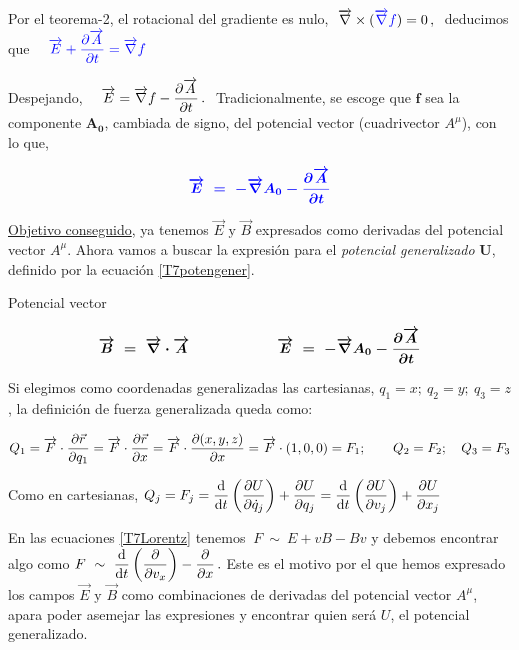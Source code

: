  Por el teorema-2, el rotacional del gradiente es nulo, $\ \overrightarrow  \nabla \times (\textcolor{blue}{\overrightarrow \nabla f})=0 \, ,\ $ deducimos que $\quad \textcolor{blue}{ \overrightarrow E + \displaystyle \pdv{\overrightarrow A}{t} = \overrightarrow \nabla f}$
 
 Despejando, $\quad  \overrightarrow E  = \overrightarrow \nabla f -  \displaystyle \pdv{\overrightarrow A}{t} \, . \ $ Tradicionalmente, se escoge que $\boldsymbol f$ sea la componente $\boldsymbol{A_0}$, cambiada de signo,  del potencial vector (cuadrivector $A^\mu$), con lo que,
 
 \begin{equation}
 \boldsymbol{ \textcolor{blue}{\overrightarrow E \ = \ -\overrightarrow \nabla A_0 -  \displaystyle \pdv{\overrightarrow A}{t}}	 }
 \end{equation}
 
\underline{Objetivo conseguido}, ya tenemos $\overrightarrow E \text{ y } \overrightarrow B$ expresados como derivadas del potencial vector $A^\mu$. Ahora vamos a buscar la expresión para el \emph{potencial generalizado} $\boldsymbol{U}$, definido por la ecuación \ref{T7potengener}.

\begin{myalertblock}{Potencial vector}
\begin{large}
\begin{equation}
\boldsymbol{ \overrightarrow B \ = \ \overrightarrow \nabla \cdot \overrightarrow A }
	\qquad \qquad \qquad 
	\boldsymbol{\overrightarrow E \ = \ -\overrightarrow \nabla A_0 -  \displaystyle \pdv{\overrightarrow A}{t}}	 
\end{equation}
\end{large}
\end{myalertblock}

\vspace{5mm}
Si elegimos como coordenadas generalizadas las cartesianas, $q_1=x;\ q_2=y;\ q_3=z$, la definición de fuerza generalizada queda como:

$Q_1=\overrightarrow F \cdot \displaystyle \pdv{\vec r}{q_1}=\overrightarrow F \cdot \displaystyle \pdv{\vec r}{x}=\overrightarrow F \cdot \displaystyle \pdv{(x,y,z)}{x}=\overrightarrow F \cdot (1,0,0)=F_1;\qquad Q_2=F_2;\quad Q_3=F_3$

Como en cartesianas, $Q_j=F_j=\displaystyle \dv{t} \left( \pdv{U}{\dot q_j} \right) + \pdv{U}{q_j}=\dv{t} \left( \pdv{U}{v_j} \right) + \pdv{U}{x_j}$

En las ecuaciones \ref{T7Lorentz} tenemos $\ F \ \sim \ E + vB-Bv$ y debemos encontrar algo como $F\  \sim \ \displaystyle \dv{t} \left(\pdv{v_x}\right) - \pdv{x}\, . \ $Este es el motivo por el que hemos expresado los campos $\overrightarrow E \text{ y } \overrightarrow B$ como combinaciones de derivadas del potencial vector $A^\mu$, apara poder asemejar las expresiones y encontrar quien será $U$, el potencial generalizado.

